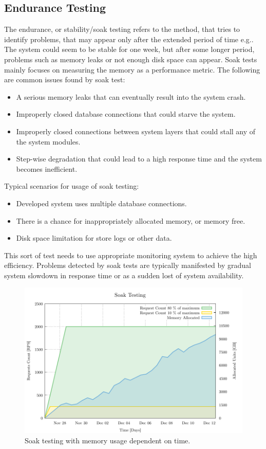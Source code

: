 \subsection*{Endurance Testing}
\label{Endurance Testing}
The endurance, or stability/soak testing refers to the method, that tries to identify problems, that may appear only after the extended period of time e.g.. The system could seem to be stable for one week, but after some longer period, problems such as memory leaks or not enough disk space can appear. Soak tests mainly focuses on measuring the memory as a performance metric. The following are common issues found by soak test:
\begin{itemize}
	\setlength\itemsep{0em}
	\item A serious memory leaks that can eventually result into the system crash.
	\item Improperly closed database connections that could starve the system.
	\item Improperly closed connections between system layers that could stall any of the system modules.
	\item Step-wise degradation that could lead to a high response time and the system becomes inefficient.
\end{itemize}
Typical scenarios for usage of soak testing:
\begin{itemize}
	\setlength\itemsep{0em}
	\item Developed system uses multiple database connections.
	\item There is a chance for inappropriately allocated memory, or memory free.
	\item Disk space limitation for store logs or other data.
\end{itemize}


This sort of test needs to use appropriate monitoring system to achieve the high efficiency. Problems detected by soak tests are typically manifested by gradual system slowdown in response time or as a sudden lost of system availability.

\begin{figure}[H]
  \centering
  \includegraphics[width=15cm]{obrazky-figures/soak_testing.pdf}
  \caption{Soak testing with memory usage dependent on time.}
  \label{fig:soak_test}
\end{figure}

